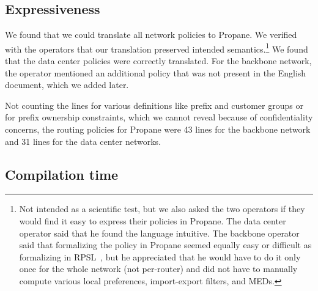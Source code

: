 \documentclass[10pt]{sigalternate052015}
\newcommand{\sysname}{{\small \sf Propane}\xspace}
\begin{document}
\subsection{Expressiveness}

We found that we could translate all network policies to \sysname. We verified with the operators that our translation preserved intended semantics.\footnote{Not intended as a scientific test, but we also asked the two operators if they would find it easy to express their policies in \sysname. The data center operator said that he found the language intuitive. The backbone operator said that formalizing the policy in \sysname seemed equally easy or difficult as formalizing in RPSL~\cite{RFC2622}, but he appreciated that he would have to do it only once for the whole network (not per-router) and did not have to manually compute various local preferences, import-export filters, and MEDs.} We found that the data center policies were correctly translated. For the backbone network, the operator mentioned an additional policy that was not present in the English document, which we added later.

Not counting the lines for various definitions like prefix and customer groups or for prefix ownership constraints, which we cannot reveal because of confidentiality concerns, the routing policies for \sysname were 43 lines for the backbone network and 31 lines for the data center networks.


\subsection{Compilation time}



\end{document}
